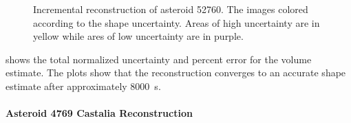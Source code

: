 \documentclass[letterpaper, paper,11pt]{AAS}		%
\begin{document}
\begin{figure}[htbp]
    \caption[Asteroid 52760 shape reconstruction with uncertainty]{Incremental reconstruction of asteroid 52760. The images colored according to the shape uncertainty. Areas of high uncertainty are in yellow while ares of low uncertainty are in purple.~\label{fig:52760_weights_reconstruction}}
\end{figure}

 shows the total normalized uncertainty and percent error for the volume estimate. 
The plots show that the reconstruction  converges to an accurate shape estimate after approximately \SI{8000}{\second}.

\paragraph{Asteroid 4769 Castalia Reconstruction}
\end{document}
